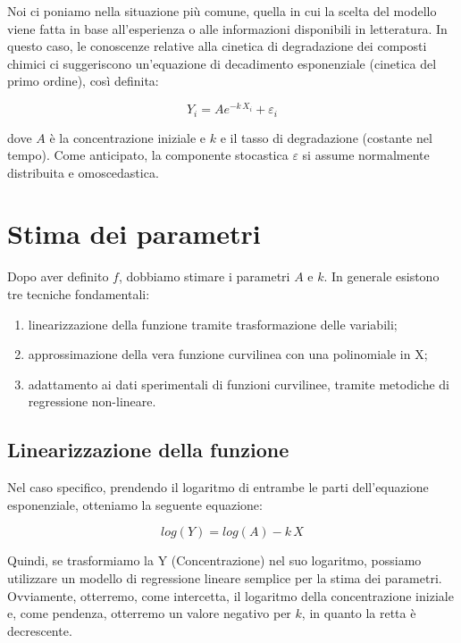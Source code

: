 \documentclass[a4paper,12pt,oneside]{book}
\providecommand{\tightlist}{%
  \setlength{\itemsep}{0pt}\setlength{\parskip}{0pt}}
\begin{document}
Noi ci poniamo nella situazione più comune, quella in cui la scelta del modello viene fatta in base all'esperienza o alle informazioni disponibili in letteratura. In questo caso, le conoscenze relative alla cinetica di degradazione dei composti chimici ci suggeriscono un'equazione di decadimento esponenziale (cinetica del primo ordine), così definita:

\[Y_i = A e^{-k \,X_i} + \varepsilon_i\]

dove \(A\) è la concentrazione iniziale e \(k\) e il tasso di degradazione (costante nel tempo). Come anticipato, la componente stocastica \(\varepsilon\) si assume normalmente distribuita e omoscedastica.

\hypertarget{stima-dei-parametri-3}{%
\section{Stima dei parametri}\label{stima-dei-parametri-3}}

Dopo aver definito \(f\), dobbiamo stimare i parametri \(A\) e \(k\). In generale esistono tre tecniche fondamentali:

\begin{enumerate}
\def\labelenumi{\arabic{enumi}.}
\tightlist
\item
  linearizzazione della funzione tramite trasformazione delle variabili;
\item
  approssimazione della vera funzione curvilinea con una polinomiale in X;
\item
  adattamento ai dati sperimentali di funzioni curvilinee, tramite metodiche di regressione non-lineare.
\end{enumerate}

\hypertarget{linearizzazione-della-funzione}{%
\subsection{Linearizzazione della funzione}\label{linearizzazione-della-funzione}}

Nel caso specifico, prendendo il logaritmo di entrambe le parti dell'equazione esponenziale, otteniamo la seguente equazione:

\[ log(Y) = log(A) - k \, X \]

Quindi, se trasformiamo la Y (Concentrazione) nel suo logaritmo, possiamo utilizzare un modello di regressione lineare semplice per la stima dei parametri. Ovviamente, otterremo, come intercetta, il logaritmo della concentrazione iniziale e, come pendenza, otterremo un valore negativo per \(k\), in quanto la retta è decrescente.
\end{document}
